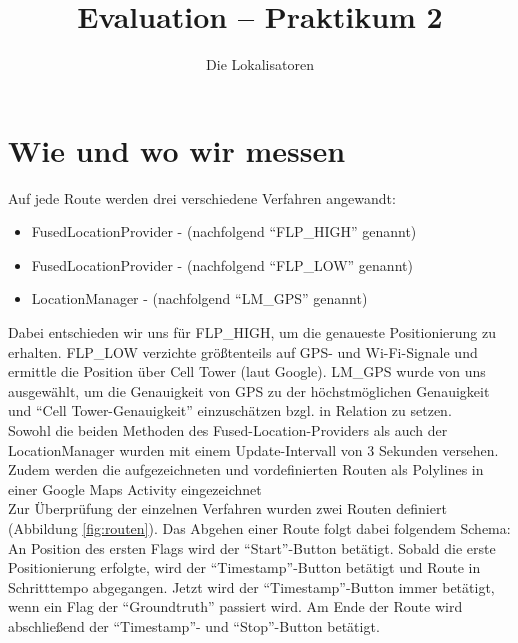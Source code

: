 

\title{Evaluation -- Praktikum 2}
\author{Die Lokalisatoren}

\ihead{}
\chead{}
\ohead{}
\ifoot{}
\cfoot{\pagemark}
\ofoot{}



\setlength{\parskip}{0em}
\setlength{\parindent}{0em}
\renewcommand{\baselinestretch}{1.5}



\docheader

\section{Wie und wo wir messen}

Auf jede Route werden drei verschiedene Verfahren angewandt: 
\begin{itemize}
	\item FusedLocationProvider -  (nachfolgend "`FLP\_HIGH"' genannt)
	\item FusedLocationProvider -  (nachfolgend "`FLP\_LOW"' genannt)
	\item LocationManager -  (nachfolgend "`LM\_GPS"' genannt)
\end{itemize}

Dabei entschieden wir uns für FLP\_HIGH, um die genaueste Positionierung zu erhalten. FLP\_LOW verzichte größtenteils auf GPS- und Wi-Fi-Signale und ermittle die Position über Cell Tower (laut Google). LM\_GPS wurde von uns ausgewählt, um die Genauigkeit von GPS zu der höchstmöglichen Genauigkeit und "`Cell Tower-Genauigkeit"' einzuschätzen bzgl. in Relation zu setzen. \\Sowohl die beiden Methoden des Fused-Location-Providers als auch der LocationManager wurden mit einem Update-Intervall von 3 Sekunden versehen. Zudem werden die aufgezeichneten und vordefinierten Routen als Polylines in einer Google Maps Activity eingezeichnet\\

Zur Überprüfung der einzelnen Verfahren wurden zwei Routen definiert (Abbildung \ref{fig:routen}). Das Abgehen einer Route folgt dabei folgendem Schema: An Position des ersten Flags wird der "`Start"'-Button betätigt. Sobald die erste Positionierung erfolgte, wird der "`Timestamp"'-Button betätigt und Route in Schritttempo abgegangen. Jetzt wird der "`Timestamp"'-Button immer betätigt, wenn ein Flag der "`Groundtruth"' passiert wird. Am Ende der Route wird abschließend der "`Timestamp"'- und "`Stop"'-Button betätigt.

